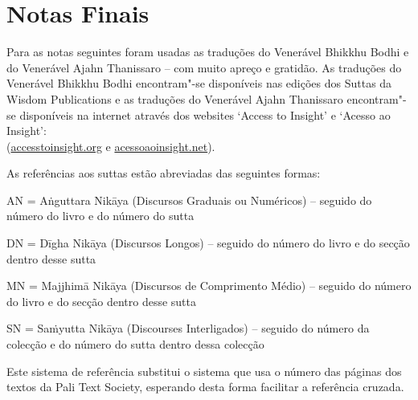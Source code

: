 \chapter{Notas Finais}

Para as notas seguintes foram usadas as traduções do Venerável Bhikkhu Bodhi e do Venerável Ajahn Thanissaro -- com muito apreço e gratidão. As traduções do Venerável Bhikkhu Bodhi encontram"-se disponíveis nas edições dos Suttas da Wisdom Publications e as traduções do Venerável Ajahn Thanissaro encontram"-se disponíveis na internet através dos websites `Access to Insight' e `Acesso ao Insight':\\
(\href{https://www.accesstoinsight.org/}{accesstoinsight.org} e \href{https://acessoaoinsight.net/}{acessoaoinsight.net}).

As referências aos suttas estão abreviadas das seguintes formas:

AN = Aṅguttara Nikāya (Discursos Graduais ou Numéricos) -- seguido do número do livro e do número do sutta

DN = Dīgha Nikāya (Discursos Longos) -- seguido do número do livro e do secção dentro desse sutta

MN = Majjhimā Nikāya (Discursos de Comprimento Médio) -- seguido do número do livro e do secção dentro desse sutta

SN = Saṁyutta Nikāya (Discourses Interligados) -- seguido do número da colecção e do número do sutta dentro dessa colecção

Este sistema de referência substitui o sistema que usa o número das páginas dos textos da Pali Text Society, esperando desta forma facilitar a referência cruzada.

\printpagenotes*
